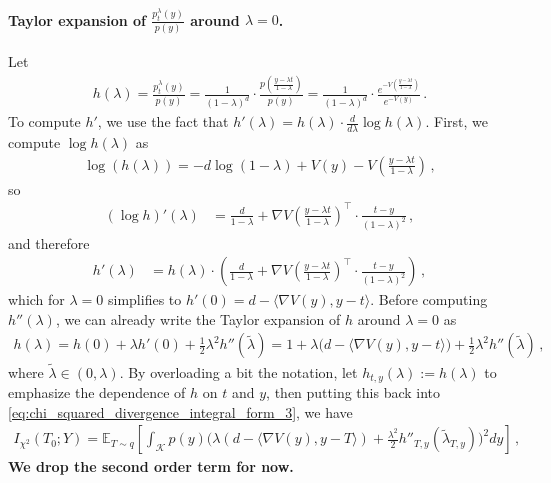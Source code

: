 \documentclass{article}
\theoremstyle{plain}
\theoremstyle{definition}
\theoremstyle{plain}
\newcommand{\cK}{\mathcal K}
\begin{document}
\paragraph{Taylor expansion of $\frac{p_t^\lambda(y)}{p(y)}$ around $\lambda=0$.}
Let
\begin{align}
    h(\lambda) = \frac{p_t^\lambda(y)}{p(y)} = \frac{1}{(1-\lambda)^d} \cdot \frac{p\left(\frac{y - \lambda t}{1-\lambda}\right)}{p(y)}
    = \frac{1}{(1-\lambda)^d} \cdot \frac{e^{-V\left(\frac{y - \lambda t}{1-\lambda}\right)}}{e^{-V(y)}}\,.
\end{align}
To compute $h'$, we use the fact that $h'(\lambda) = h(\lambda) \cdot \frac{d}{d\lambda} \log h(\lambda)$.
First, we compute $\log h(\lambda)$ as
\begin{align}
    \log(h(\lambda)) = -d \log(1-\lambda) + V(y) - V\left(\frac{y - \lambda t}{1-\lambda}\right)\,,
\end{align}
so
\begin{align}
    (\log h)'(\lambda)
     & = \frac{d}{1-\lambda} + \nabla V\left(\frac{y - \lambda t}{1-\lambda}\right)^\top \cdot \frac{t-y}{(1-\lambda)^2}\,,
\end{align}
and therefore
\begin{align}
    h'(\lambda)
     & = h(\lambda) \cdot \left(\frac{d}{1-\lambda} + \nabla V\left(\frac{y - \lambda t}{1-\lambda}\right)^\top \cdot \frac{t-y}{(1-\lambda)^2}\right)\,,
\end{align}
which for $\lambda = 0$ simplifies to $h'(0) = d - \langle \nabla V(y), y-t \rangle$.
Before computing $h''(\lambda)$, we can already write the Taylor expansion of $h$ around $\lambda = 0$ as
\begin{align}
    h(\lambda) = h(0) + \lambda h'(0) + \frac{1}{2} \lambda^2 h''(\tilde{\lambda}) = 1 + \lambda \Big( d - \langle \nabla V(y), y-t \rangle \Big) + \frac{1}{2} \lambda^2 h''(\tilde{\lambda})\,,
\end{align}
where $\tilde{\lambda} \in (0, \lambda)$.
By overloading a bit the notation, let $h_{t,y}(\lambda) := h(\lambda)$ to emphasize the dependence of $h$ on $t$ and $y$, then
putting this back into \eqref{eq:chi_squared_divergence_integral_form_3}, we have
\begin{align}
    I_{\chi^2}(T_0; Y) = \mathbb{E}_{T \sim q}
    \left[
    \int_{\cK} p(y) \Big( \lambda (d - \langle \nabla V(y), y-T \rangle) + \frac{\lambda^2}{2} h''_{T,y}(\tilde{\lambda}_{T,y}) \Big)^2 dy
    \right]\,,
\end{align}
\textbf{We drop the second order term for now.}
\end{document}
